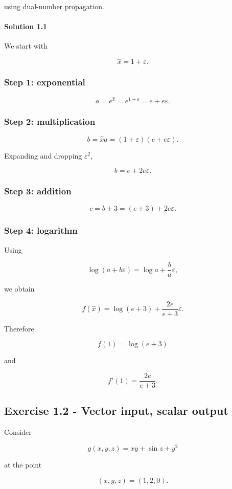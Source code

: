\documentclass[10pt]{article}
\begin{document}
using dual-number propagation.

\begingroup\color{red}
\paragraph*{Solution 1.1}
We start with

\[
\hat{x}=1+\varepsilon.
\]

\subsubsection*{Step 1: exponential}
\[
a=e^{\hat{x}}
=e^{1+\varepsilon}
=e+e\varepsilon.
\]

\subsubsection*{Step 2: multiplication}
\[
b=\hat{x}a
=(1+\varepsilon)(e+e\varepsilon).
\]

Expanding and dropping $\varepsilon^2$,

\[
b=e+2e\varepsilon.
\]

\subsubsection*{Step 3: addition}
\[
c=b+3
=(e+3)+2e\varepsilon.
\]

\subsubsection*{Step 4: logarithm}
Using

\[
\log(a+b\varepsilon)
=\log a+\frac{b}{a}\varepsilon,
\]

we obtain

\[
f(\hat{x})
=
\log(e+3)
+
\frac{2e}{e+3}\varepsilon.
\]

Therefore

\[
{f(1)=\log(e+3)}
\]

and

\[
{
f'(1)=\frac{2e}{e+3}
}.
\]
\par\endgroup

\subsection*{Exercise 1.2 - Vector input, scalar output}
Consider

\[
g(x,y,z)=xy+\sin z+y^2
\]

at the point

\[
(x,y,z)=(1,2,0).
\]
\end{document}
